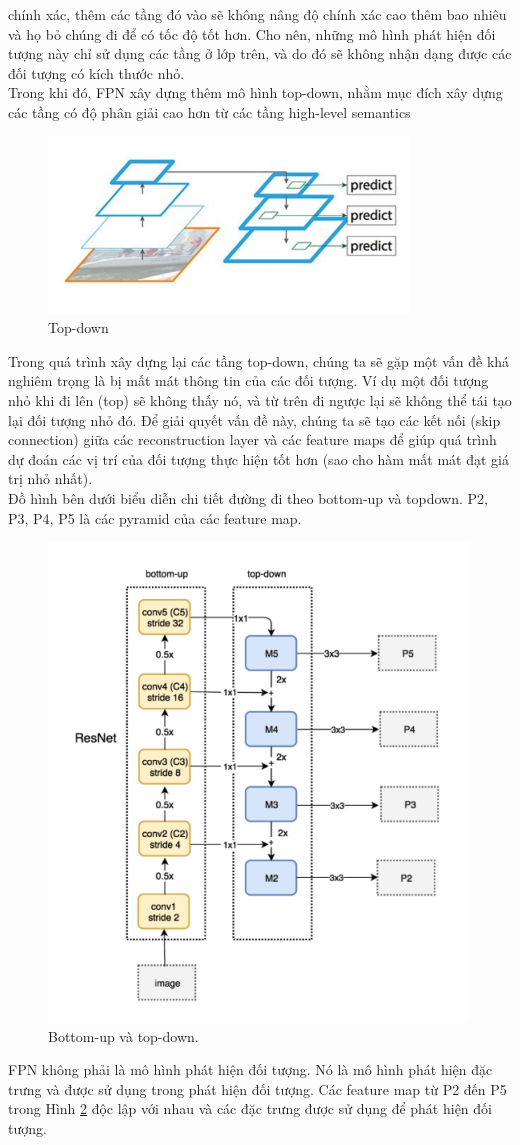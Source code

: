 \documentclass[a4paper, 12pt]{report}
\begin{document}
chính xác, thêm các tầng đó vào sẽ không nâng độ chính xác cao thêm bao
nhiêu và họ bỏ chúng đi để có tốc độ tốt hơn. Cho nên, những mô hình phát hiện đối tượng này chỉ sử dụng các tầng ở lớp trên, và do đó sẽ không nhận
dạng được các đối tượng có kích thước nhỏ. \\
\hspace*{1cm}Trong khi đó, FPN xây dựng thêm mô hình top-down, nhằm mục đích
xây dựng các tầng có độ phân giải cao hơn từ các tầng high-level semantics
\begin{figure}[!h]
	\centering
	\includegraphics[width=0.5\linewidth]{Images/fpn3}
	\caption{Top-down}
	\label{fig:resnet-fpn3}
\end{figure}
\hspace*{1cm}Trong quá trình xây dựng lại các tầng top-down, chúng ta sẽ gặp một
vấn đề khá nghiêm trọng là bị mất mát thông tin của các đối tượng. Ví dụ
một đối tượng nhỏ khi đi lên (top) sẽ không thấy nó, và từ trên đi ngược
lại sẽ không thể tái tạo lại đối tượng nhỏ đó. Để giải quyết vấn đề này,
chúng ta sẽ tạo các kết nối (skip connection) giữa các reconstruction layer
và các feature maps để giúp quá trình dự đoán các vị trí của đối tượng
thực hiện tốt hơn (sao cho hàm mất mát đạt giá trị nhỏ nhất).  \\
\hspace*{1cm}Đồ hình bên dưới biểu diễn chi tiết đường đi theo bottom-up và topdown. P2, P3, P4, P5 là các pyramid của các feature map. \\
\begin{figure}[!h]
	\centering
	\includegraphics[width=0.5\linewidth]{Images/fpn4}
	\caption{Bottom-up và top-down.}
	\label{fig:resnet-fpn4}
\end{figure}
\hspace*{1cm}FPN không phải là mô hình phát hiện đối tượng. Nó là mô hình phát
hiện đặc trưng và được sử dụng trong phát hiện đối tượng. Các feature
map từ P2 đến P5 trong Hình \ref{fig:resnet-fpn4} độc lập với nhau và các đặc trưng
được sử dụng để phát hiện đối tượng.
\end{document}
